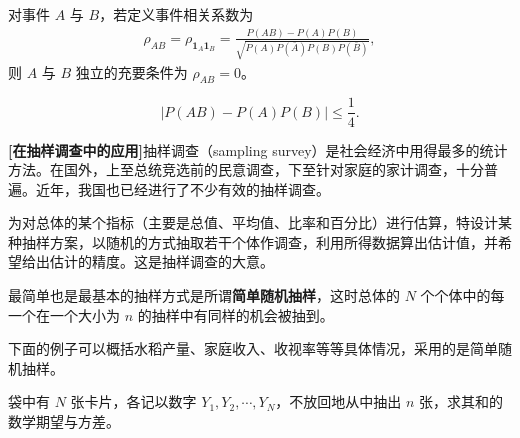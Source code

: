 \documentclass[../../main.tex]{subfiles}
\begin{document}
\begin{corollary}[事件相关系数]\label{corollary:ch04-事件相关系数}
对事件 $A$ 与 $B$，若定义事件相关系数为
\begin{align}
\rho_{AB}=\rho_{\mathbf{1}_A\mathbf{1}_B}=\frac{P(AB)-P(A)P(B)}{\sqrt{P(A)P(\bar{A})P(B)P(\bar{B})}},\label{align:ch04-事件相关系数}
\end{align}
则 $A$ 与 $B$ 独立的充要条件为 $\rho_{AB}=0$。
\end{corollary}

\begin{corollary}\label{corollary:ch04-PAB界}
\[
|P(AB)-P(A)P(B)|\leqslant\frac14.\label{align:ch04-PAB界}
\]
\end{corollary}

\noindent\textbf{[在抽样调查中的应用]}\quad 抽样调查（sampling survey）是社会经济中用得最多的统计方法。在国外，上至总统竞选前的民意调查，下至针对家庭的家计调查，十分普遍。近年，我国也已经进行了不少有效的抽样调查。

为对总体的某个指标（主要是总值、平均值、比率和百分比）进行估算，特设计某种抽样方案，以随机的方式抽取若干个体作调查，利用所得数据算出估计值，并希望给出估计的精度。这是抽样调查的大意。

最简单也是最基本的抽样方式是所谓\textbf{简单随机抽样}，这时总体的 $N$ 个个体中的每一个在一个大小为 $n$ 的抽样中有同样的机会被抽到。

下面的例子可以概括水稻产量、家庭收入、收视率等等具体情况，采用的是简单随机抽样。

\begin{example}[不放回抽样之和的期望与方差]\label{example:ch04-不放回抽样}
袋中有 $N$ 张卡片，各记以数字 $Y_1,Y_2,\cdots,Y_N$，不放回地从中抽出 $n$ 张，求其和的数学期望与方差。
\end{example}
\end{document}

